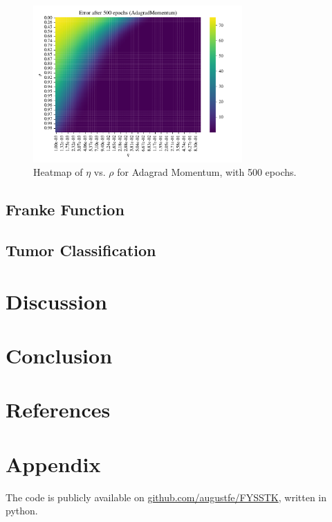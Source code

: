 \documentclass{article}
\theoremstyle{definition}
\begin{document}
\begin{figure}[H]%
    \centering
    \includegraphics[width=8cm]{Project2/figures/polynomial_grad/OLS_autodiff/adagrad_momentum_heatmap_eta_rho.pdf}
    \caption{Heatmap of $\eta$ vs. $\rho$ for Adagrad Momentum, with 500 epochs.}
    \label{fig:GDadagradmomentumpred}
\end{figure}

\newpage

\subsection{Franke Function}

\subsection{Tumor Classification}

\newpage
\section{Discussion}

\section{Conclusion}

\section{References}

\printbibliography

\section{Appendix}
The code is publicly available on \href{https://github.com/augustfe/FYSSTK}{github.com/augustfe/FYSSTK}, written in python.
\end{document}
